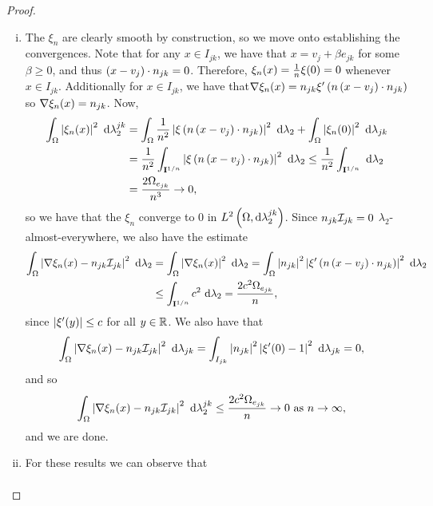 \begin{proof}
	\begin{enumerate}[(i)]
		\item The $\xi_n$ are clearly smooth by construction, so we move onto establishing the convergences.
		Note that for any $x\in I_{jk}$, we have that $x = v_j + \beta e_{jk}$ for some $\beta\geq0$, and thus $\left( x-v_j \right)\cdot n_{jk} = 0$.
		Therefore, $\xi_n(x) = \frac{1}{n}\xi(0) = 0$ whenever $x\in I_{jk}$.
		Additionally for $x\in I_{jk}$, we have that$\nabla\xi_n(x) = n_{jk}\xi'\left( n\left( x-v_j \right)\cdot n_{jk} \right)$ so $\nabla\xi_n(x) = n_{jk}$.
		Now,
		\begin{align*}
			\int_{\Omega} \left\lvert \xi_n(x) \right\rvert^2  \ \mathrm{d}\lambda_2^{jk}
			&= \int_{\Omega} \frac{1}{n^2}\left\lvert \xi\left( n\left( x-v_j \right)\cdot n_{jk} \right) \right\rvert^2  \ \mathrm{d}\lambda_2
			+ \int_{\Omega} \left\lvert \xi_n(0) \right\rvert^2  \ \mathrm{d}\lambda_{jk} \\
			&= \frac{1}{n^2}\int_{\mathbf{I}^{1/n}} \left\lvert \xi\left( n\left( x-v_j \right)\cdot n_{jk} \right) \right\rvert^2  \ \mathrm{d}\lambda_2
			\leq \frac{1}{n^2}\int_{\mathbf{I}^{1/n}}  \ \mathrm{d}\lambda_2 \\
			&= \frac{2\Omega_{e_{jk}}}{n^3} \rightarrow 0,
		\end{align*}
		so we have that the $\xi_n$ converge to 0 in $L^{2}\left( \Omega,\mathrm{d} \lambda_2^{jk} \right)$.
		Since $n_{jk}\mathcal{I}_{jk}=0$ $\lambda_2$-almost-everywhere, we also have the estimate
		\begin{align*}
			\int_{\Omega} \left\lvert  \nabla\xi_n(x) - n_{jk}\mathcal{I}_{jk}  \right\rvert^2  \ \mathrm{d}\lambda_2
			&= \int_{\Omega} \left\lvert  \nabla\xi_n(x)  \right\rvert^2  \ \mathrm{d}\lambda_2
			= \int_{\Omega} \left\lvert n_{jk} \right\rvert^2\left\lvert \xi'\left( n\left( x-v_j \right)\cdot n_{jk} \right) \right\rvert^2  \ \mathrm{d}\lambda_2 \\
			&\leq \int_{\mathbf{I}^{1/n}} c^2  \ \mathrm{d}\lambda_2 
			= \frac{2c^2\Omega_{e_{jk}}}{n},
		\end{align*}
		since $\left\lvert \xi'(y) \right\rvert\leq c$ for all $y\in\mathbb{R}$.
		We also have that
		\begin{align*}
			\int_{\Omega} \left\lvert  \nabla\xi_n(x) - n_{jk}\mathcal{I}_{jk}  \right\rvert^2  \ \mathrm{d}\lambda_{jk}
			&= \int_{I_{jk}} \left\lvert n_{jk} \right\rvert^2\left\lvert  \xi'(0)-1  \right\rvert^2  \ \mathrm{d}\lambda_{jk} = 0,
		\end{align*}
		and so
		\begin{align*}
			\int_{\Omega} \left\lvert  \nabla\xi_n(x) - n_{jk}\mathcal{I}_{jk}  \right\rvert^2  \ \mathrm{d}\lambda_2^{jk}
			&\leq \frac{2c^2\Omega_{e_{jk}}}{n} \rightarrow 0 \ \text{as} \ n \rightarrow\infty,
		\end{align*}
		and we are done.
		\item For these results we can observe that
		\begin{align*}

\end{align*}
\end{enumerate}
\end{proof}
